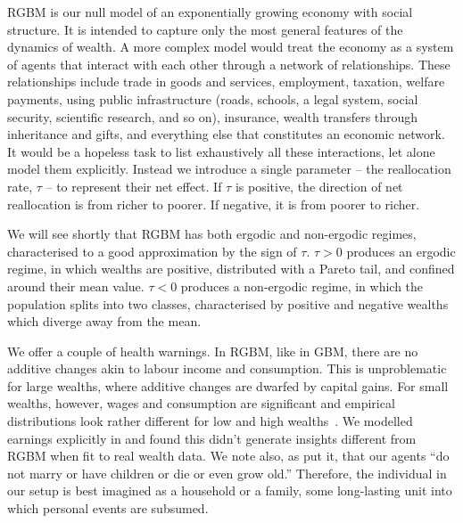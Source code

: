 RGBM is our null model of an exponentially growing economy with social structure. It is intended to capture only the most general features of the dynamics of wealth. A more complex model would treat the economy as a system of agents that interact with each other through a network of relationships. These relationships include trade in goods and services, employment, taxation, welfare payments, using public infrastructure (roads, schools, a legal system, social security, scientific research, and so on), insurance, wealth transfers through inheritance and gifts, and everything else that constitutes an economic network. It would be a hopeless task to list exhaustively all these interactions, let alone model them explicitly. Instead we introduce a single parameter -- the reallocation rate, $\tau$ -- to represent their net effect. If $\tau$ is positive, the direction of net reallocation is from richer to poorer. If negative, it is from poorer to richer.

We will see shortly that RGBM has both ergodic and non-ergodic regimes, characterised to a good approximation by the sign of $\tau$. $\tau>0$ produces an ergodic regime, in which wealths are positive, distributed with a Pareto tail, and confined around their mean value. $\tau<0$ produces a non-ergodic regime, in which the population splits into two classes, characterised by positive and negative wealths which diverge away from the mean.

We offer a couple of health warnings. In RGBM, like in GBM, there are no additive changes akin to labour income and consumption. This is unproblematic for large wealths, where additive changes are dwarfed by capital gains. For small wealths, however, wages and consumption are significant and empirical distributions look rather different for low and high wealths~\cite{DragulescuYakovenko2001}. We modelled earnings explicitly in \cite{BermanPetersAdamou2017} and found this didn't generate insights different from RGBM when fit to real wealth data. We note also, as \cite[p.~41]{meade1964efficiency} put it, that our agents ``do not marry or have children or die or even grow old.'' Therefore, the individual in our setup is best imagined as a household or a family, \ie some long-lasting unit into which personal events are subsumed.

